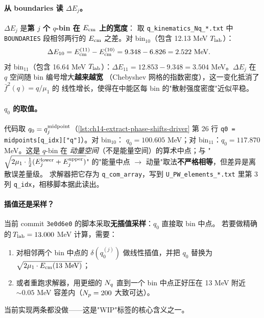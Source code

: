 \paragraph{从 boundaries 读 \(\Delta E_j\)。}
\(\Delta E_j\) 是\textbf{第 \(j\) 个 \(q\)-bin 在 \(E_{\rm cm}\) 上的宽度}：
取 \texttt{q\_kinematics\_Nq\_*.txt} 中 \texttt{BOUNDARIES} 段相邻两行的
\(E_{\rm cm}\) 之差。对 bin\(_{10}\)（包含 12.13 MeV \({T_{\text{lab}}}\)）：
\begin{align}
\Delta E_{10} &= E_{\rm cm}^{(11)} - E_{\rm cm}^{(10)}
              = 9.348 - 6.826
              = 2.522~\text{MeV}.
\end{align}
对 bin\(_{11}\)（包含 16.64 MeV \({T_{\text{lab}}}\)）：\(\Delta E_{11} = 12.853 - 9.348
= 3.504\) MeV。\(\Delta E_j\) 在 \(q\) 空间随 bin 编号增大\textbf{越来越宽}
（Chebyshev 网格的指数密度），这一变化抵消了 \(\bar{f}^2(q) = q/\mu_1\) 的
线性增长，使得在中能区每 bin 的"散射强度密度"近似平稳。

\paragraph{\(q_0\) 的取值。}
代码取 \(q_0 = q^{\rm midpoint}_j\)（\cref{lst:ch14-extract-phase-shifts-driver}
第 26 行 \verb|q0 = midpoints[q_idx]["q"]|）。对 bin\(_{10}\)：
\(q_0 = 100.605\) MeV；对 bin\(_{11}\)：\(q_0 = 117.870\) MeV。这是
\(q\)-bin 在 \emph{动量空间}（不是能量空间）的算术中点；与
"\(\sqrt{2\mu_1 \cdot \tfrac{1}{2}(E_j^{\rm lower}+E_j^{\rm upper})}\)"
的"能量中点 \(\to\) 动量"取法\textbf{不严格相等}，但差异是离散误差量级。
求解器把它存为 \texttt{q\_com\_array}，写到 \texttt{U\_PW\_elements\_*.txt}
里第 3 列 \texttt{q\_idx}，相移脚本据此读出。

\paragraph{插值还是采样？}
当前 commit \texttt{3e0d6e0} 的脚本采取\textbf{无插值采样}：\(q_0\) 直接取 bin
中点。
若要做精确的\(\,{T_{\text{lab}}} = 13.000\) MeV 计算，需要：
\begin{enumerate}
  \item 对相邻两个 bin 中点的 \(\delta(q_0^{(j)})\) 做线性插值，并把
        \(q_0\) 替换为 \(\sqrt{2\mu_1 \cdot E_{\rm cm}(13~\text{MeV})}\)；
  \item 或者重跑求解器，用更细的 \(N_q\) 直到一个 bin 中点正好压在 13 MeV
        附近\(\sim 0.05\) MeV 容差内（\(N_p = 200\) 大致可达）。
\end{enumerate}
当前实现两条都没做——这是"WIP"标签的核心含义之一。

